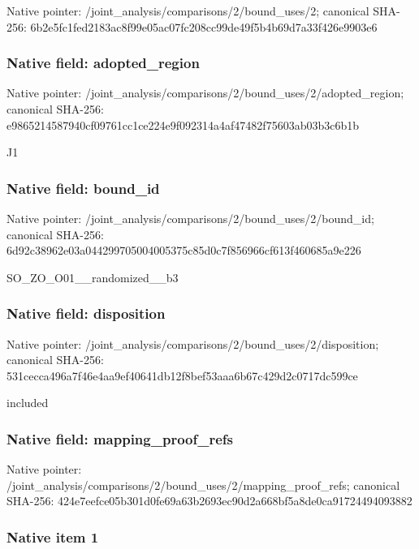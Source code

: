 \documentclass[10pt,a4paper]{article}
\begin{document}
Native pointer: /joint\_analysis/comparis\allowbreak{}ons/2/bound\_uses/2; canonical SHA-256: 6b2e5fc1fed2183ac8f99e05\allowbreak{}ac07fc208cc99de49f5b4b69\allowbreak{}d7a33f426e9903e6



\subsubsection{Native field: adopted\_region}


Native pointer: /joint\_analysis/comparis\allowbreak{}ons/2/bound\_uses/2/adopt\allowbreak{}ed\_region; canonical SHA-256: e9865214587940cf09761cc1\allowbreak{}ce224e9f092314a4af47482f\allowbreak{}75603ab03b3c6b1b


J1


\subsubsection{Native field: bound\_id}


Native pointer: /joint\_analysis/comparis\allowbreak{}ons/2/bound\_uses/2/bound\allowbreak{}\_id; canonical SHA-256: 6d92c38962e03a0442997050\allowbreak{}04005375c85d0c7f856966cf\allowbreak{}613f460685a9e226


SO\_ZO\_O01\_\_randomized\_\_b3


\subsubsection{Native field: disposition}


Native pointer: /joint\_analysis/comparis\allowbreak{}ons/2/bound\_uses/2/dispo\allowbreak{}sition; canonical SHA-256: 531cecca496a7f46e4aa9ef4\allowbreak{}0641db12f8bef53aaa6b67c4\allowbreak{}29d2c0717dc599ce


included


\subsubsection{Native field: mapping\_proof\_refs}


Native pointer: /joint\_analysis/comparis\allowbreak{}ons/2/bound\_uses/2/mappi\allowbreak{}ng\_proof\_refs; canonical SHA-256: 424e7eefce05b301d0fe69a6\allowbreak{}3b2693ec90d2a668bf5a8de0\allowbreak{}ca91724494093882



\subsubsection{Native item 1}
\end{document}
